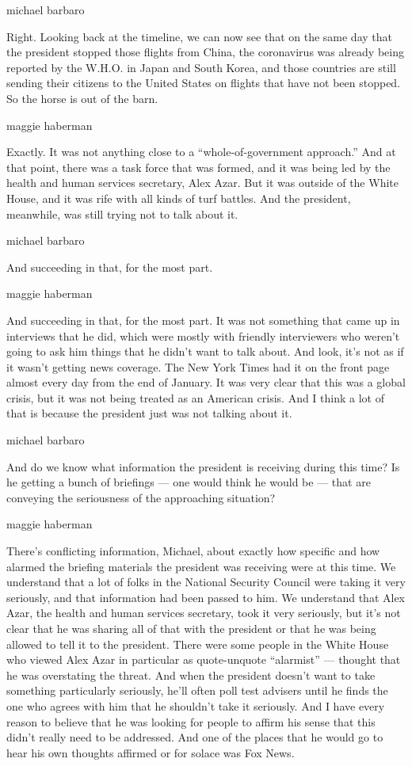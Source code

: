 michael barbaro

Right. Looking back at the timeline, we can now see that on the same day
that the president stopped those flights from China, the coronavirus was
already being reported by the W.H.O. in Japan and South Korea, and those
countries are still sending their citizens to the United States on
flights that have not been stopped. So the horse is out of the barn.

maggie haberman

Exactly. It was not anything close to a ``whole-of-government
approach.'' And at that point, there was a task force that was formed,
and it was being led by the health and human services secretary, Alex
Azar. But it was outside of the White House, and it was rife with all
kinds of turf battles. And the president, meanwhile, was still trying
not to talk about it.

michael barbaro

And succeeding in that, for the most part.

maggie haberman

And succeeding in that, for the most part. It was not something that
came up in interviews that he did, which were mostly with friendly
interviewers who weren't going to ask him things that he didn't want to
talk about. And look, it's not as if it wasn't getting news coverage.
The New York Times had it on the front page almost every day from the
end of January. It was very clear that this was a global crisis, but it
was not being treated as an American crisis. And I think a lot of that
is because the president just was not talking about it.

michael barbaro

And do we know what information the president is receiving during this
time? Is he getting a bunch of briefings --- one would think he would be
--- that are conveying the seriousness of the approaching situation?

maggie haberman

There's conflicting information, Michael, about exactly how specific and
how alarmed the briefing materials the president was receiving were at
this time. We understand that a lot of folks in the National Security
Council were taking it very seriously, and that information had been
passed to him. We understand that Alex Azar, the health and human
services secretary, took it very seriously, but it's not clear that he
was sharing all of that with the president or that he was being allowed
to tell it to the president. There were some people in the White House
who viewed Alex Azar in particular as quote-unquote ``alarmist'' ---
thought that he was overstating the threat. And when the president
doesn't want to take something particularly seriously, he'll often poll
test advisers until he finds the one who agrees with him that he
shouldn't take it seriously. And I have every reason to believe that he
was looking for people to affirm his sense that this didn't really need
to be addressed. And one of the places that he would go to hear his own
thoughts affirmed or for solace was Fox News.

